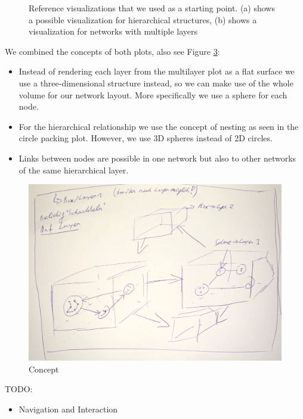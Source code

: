 \begin{figure}[h]
\begin{subfigure}[b]{0.50\columnwidth}
      \label{fig:2dmultilayerVis}
    \end{subfigure}
    \caption[Optional caption for the figure list (often used to abbreviate long captions)]{Reference visualizations that we used as a starting point. (a) shows a possible visualization for hierarchical structures, (b) shows a visualization for networks with multiple layers} %
    \label{fig:referenceVisualizations} 
  \end{figure}

We combined the concepts of both plots, also see Figure \ref{fig:conceptSketch}: 
\begin{itemize}
    \item Instead of rendering each layer from the multilayer plot as a flat surface we use a three-dimensional structure instead, so we can make use of the whole volume for our network layout. More specifically we use a sphere for each node.
    \item For the hierarchical relationship we use the concept of nesting as seen in the circle packing plot. However, we use 3D spheres instead of 2D circles. 
    \item Links between nodes are possible in one network but also to other networks of the same hierarchical layer.   
\end{itemize}

\begin{figure}[h]
    \centering
    \includegraphics[width=1\textwidth]{chapters/graphics/concept1.jpg}
    \caption{Concept} %
    \label{fig:conceptSketch} 
\end{figure}
TODO:
\begin{itemize}
    \item Navigation and Interaction
\end{itemize}

